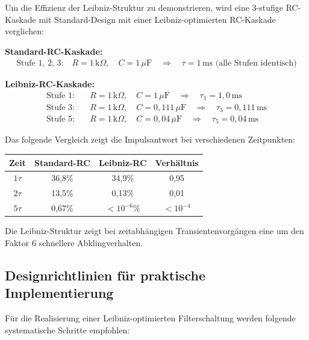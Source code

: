 \documentclass[a4paper, 12pt, twoside, openright]{report}
\theoremstyle{definition}
\theoremstyle{definition}
\begin{document}
Um die Effizienz der Leibniz-Struktur zu demonstrieren, wird eine 3-stufige RC-Kaskade mit Standard-Design mit einer Leibniz-optimierten RC-Kaskade verglichen:

\textbf{Standard-RC-Kaskade:}
\begin{align}
	\text{Stufe 1, 2, 3:} \quad R = 1\,\text{k}\Omega, \quad C = 1\,\mu\text{F} \quad \Rightarrow \quad \tau = 1\,\text{ms (alle Stufen identisch)}
\end{align}

\textbf{Leibniz-RC-Kaskade:}
\begin{align}
	\text{Stufe 1:} &\quad R = 1\,\text{k}\Omega, \quad C = 1\,\mu\text{F} \quad \Rightarrow \quad \tau_1 = 1,0\,\text{ms} \\
	\text{Stufe 3:} &\quad R = 1\,\text{k}\Omega, \quad C = 0,111\,\mu\text{F} \quad \Rightarrow \quad \tau_3 = 0,111\,\text{ms} \\
	\text{Stufe 5:} &\quad R = 1\,\text{k}\Omega, \quad C = 0,04\,\mu\text{F} \quad \Rightarrow \quad \tau_5 = 0,04\,\text{ms}
\end{align}

Das folgende Vergleich zeigt die Impulsantwort bei verschiedenen Zeitpunkten:

\begin{center}
\begin{tabular}{c|c|c|c}
Zeit & Standard-RC & Leibniz-RC & Verhältnis \\
\hline
$1\tau$ & 36,8\% & 34,9\% & 0,95 \\
$2\tau$ & 13,5\% & 0,13\% & 0,01 \\
$5\tau$ & 0,67\% & $< 10^{-6}\%$ & $< 10^{-4}$ \\
\end{tabular}
\end{center}

Die Leibniz-Struktur zeigt bei zeitabhängigen Transientenvorgängen eine um den Faktor 6 schnellere Abklingverhalten.

\subsection{Designrichtlinien für praktische Implementierung}

Für die Realisierung einer Leibniz-optimierten Filterschaltung werden folgende systematische Schritte empfohlen:
\end{document}
